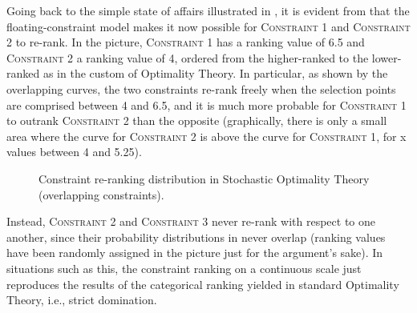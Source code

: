 Going back to the simple state of affairs illustrated in , it is evident from  that the floating-constraint model makes it now possible for \textsc{Constraint 1} and \textsc{Constraint 2} to re-rank. In the picture, \textsc{Constraint 1} has a ranking value of 6.5 and \textsc{Constraint 2} a ranking value of 4, ordered from the higher-ranked to the lower-ranked as in the custom of Optimality Theory. In particular, as shown by the overlapping curves, the two constraints re-rank freely when the selection points are comprised between 4 and 6.5, and it is much more probable for \textsc{Constraint 1} to outrank \textsc{Constraint 2} than the opposite (graphically, there is only a small area where the curve for \textsc{Constraint 2} is above the curve for \textsc{Constraint 1}, for x values between 4 and 5.25).


\begin{figure}[htb]
\caption{Constraint re-ranking distribution in Stochastic Optimality Theory (overlapping constraints).}
\end{figure}

Instead, \textsc{Constraint 2} and \textsc{Constraint 3} never re-rank with respect to one another, since their probability distributions in  never overlap (ranking values have been randomly assigned in the picture just for the argument's sake). In situations such as this, the constraint ranking on a continuous scale just reproduces the results of the categorical ranking yielded in standard Optimality Theory, i.e., strict domination.

